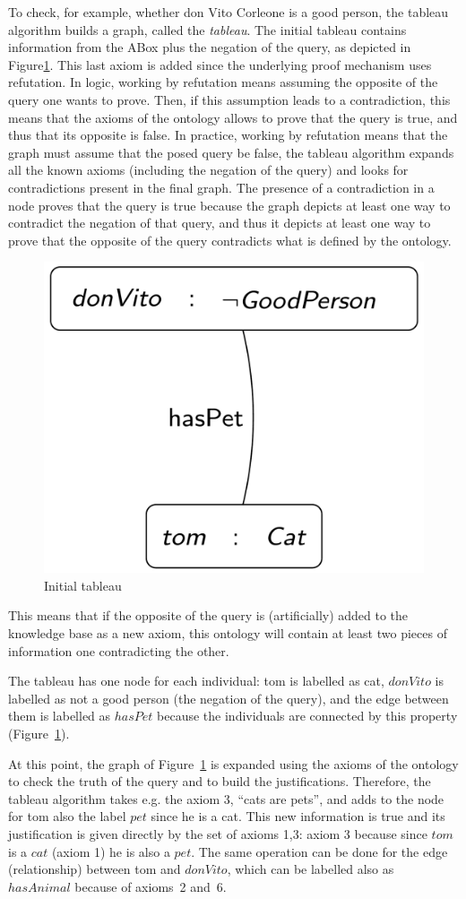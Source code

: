 To check, for example, whether don Vito Corleone is a good person, the tableau algorithm builds a graph, called the \emph{tableau}. The initial tableau contains information from the ABox plus the negation of the query, as depicted in Figure\ref{fig:tab1}. This last axiom is added since the underlying proof mechanism uses refutation. In logic, working by refutation means assuming the opposite of the query one wants to prove. Then, if this assumption leads to a contradiction, this means that the axioms of the ontology allows to prove that the query is true, and thus that its opposite is false. In practice, working by refutation means that the graph must assume that the posed query be false, the tableau algorithm expands all the known axioms (including the negation of the query) and looks for contradictions present in the final graph. The presence of a contradiction in a node proves that the query is true because the graph depicts at least one way to contradict the negation of that query, and thus it depicts at least one way to prove that the opposite of the query contradicts what is defined by the ontology. 

\begin{figure}
	\centering
	\includegraphics[width=0.5\linewidth]{img/tab1}
	\caption{Initial tableau}
	\label{fig:tab1}
\end{figure}

This means that if the opposite of the query is (artificially) added to the knowledge base as a new axiom, this ontology will contain at least two pieces of information one contradicting the other.

The tableau has one node for each individual: tom is labelled as cat, $donVito$ is labelled as not a good person (the negation of the query), and the edge between them is labelled as $hasPet$ because the individuals are connected by this property (Figure~\ref{fig:tab1}).

At this point, the graph of Figure~\ref{fig:tab1} is expanded using the axioms of the ontology to check the truth of the query and to build the justifications. Therefore, the tableau algorithm takes e.g. the axiom 3, ``cats are pets'', and adds to the node for tom also the label $pet$ since he is a cat. This new information is true and its justification is given directly by the set of axioms {1,3}: axiom 3 because since $tom$ is a $cat$ (axiom 1) he is also a $pet$. The same operation can be done for the edge (relationship) between tom and $donVito$, which can be labelled also as $hasAnimal$ because of axioms~2 and~6.

